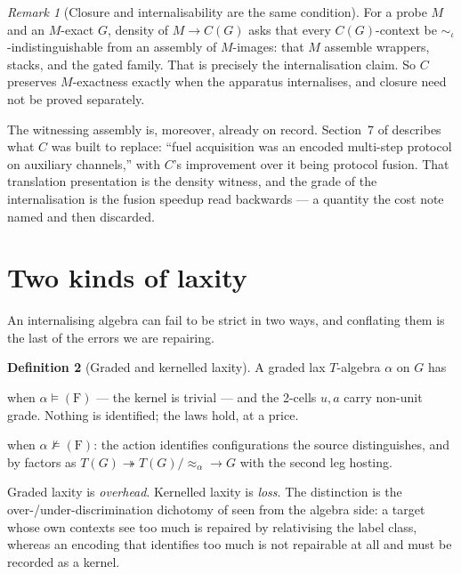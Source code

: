 \documentclass[11pt,a4paper]{article}
\theoremstyle{definition}
\newtheorem{definition}{Definition}[section]
\theoremstyle{plain}
\theoremstyle{remark}
\newtheorem{remark}[definition]{Remark}
\newcommand{\Fcond}{(\mathrm{F})}
\begin{document}
\begin{remark}[Closure and internalisability are the same condition]
\label{rmk:closure}
For a probe $M$ and an $M$-exact $G$, density of $M \to C(G)$ asks that every $C(G)$-context be
$\sim_\iota$-indistinguishable from an assembly of $M$-images: that $M$ assemble wrappers, stacks,
and the gated family. That is precisely the internalisation claim. So $C$ preserves $M$-exactness
exactly when the apparatus internalises, and closure need not be proved separately.

The witnessing assembly is, moreover, already on record. Section~7 of \cite{cost} describes what $C$
was built to replace: ``fuel acquisition was an encoded multi-step protocol on auxiliary channels,''
with $C$'s improvement over it being protocol fusion. That translation presentation is the density
witness, and the grade of the internalisation is the fusion speedup read backwards --- a quantity the
cost note named and then discarded.
\end{remark}

\section{Two kinds of laxity}
\label{sec:laxities}

An internalising algebra can fail to be strict in two ways, and conflating them is the last of the
errors we are repairing.

\begin{definition}[Graded and kernelled laxity]
\label{def:laxities}
A graded lax $T$-algebra $\alpha$ on $G$ has
\begin{description}[leftmargin=2.2em,style=nextline]
\item[graded laxity] when $\alpha \models \Fcond$ --- the kernel is trivial --- and the 2-cells
$u, a$ carry non-unit grade. Nothing is identified; the laws hold, at a price.
\item[kernelled laxity] when $\alpha \not\models \Fcond$: the action identifies configurations the
source distinguishes, and by \cite[Prop.~4.11]{probe} factors as
$T(G) \twoheadrightarrow T(G)/{\approx_\alpha} \to G$ with the second leg hosting.
\end{description}
\end{definition}

Graded laxity is \emph{overhead}. Kernelled laxity is \emph{loss}. The distinction is the
over-/under-discrimination dichotomy of \cite[Rmk.~2.17]{probe} seen from the algebra side: a target
whose own contexts see too much is repaired by relativising the label class, whereas an encoding
that identifies too much is not repairable at all and must be recorded as a kernel.
\end{document}
